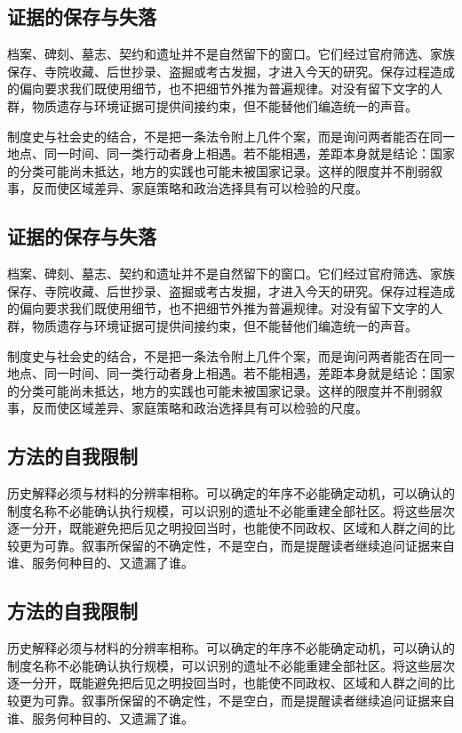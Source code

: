 \subsection{证据的保存与失落}

档案、碑刻、墓志、契约和遗址并不是自然留下的窗口。它们经过官府筛选、家族保存、寺院收藏、后世抄录、盗掘或考古发掘，才进入今天的研究。保存过程造成的偏向要求我们既使用细节，也不把细节外推为普遍规律。对没有留下文字的人群，物质遗存与环境证据可提供间接约束，但不能替他们编造统一的声音。

制度史与社会史的结合，不是把一条法令附上几件个案，而是询问两者能否在同一地点、同一时间、同一类行动者身上相遇。若不能相遇，差距本身就是结论：国家的分类可能尚未抵达，地方的实践也可能未被国家记录。这样的限度并不削弱叙事，反而使区域差异、家庭策略和政治选择具有可以检验的尺度。
\subsection{证据的保存与失落}

档案、碑刻、墓志、契约和遗址并不是自然留下的窗口。它们经过官府筛选、家族保存、寺院收藏、后世抄录、盗掘或考古发掘，才进入今天的研究。保存过程造成的偏向要求我们既使用细节，也不把细节外推为普遍规律。对没有留下文字的人群，物质遗存与环境证据可提供间接约束，但不能替他们编造统一的声音。

制度史与社会史的结合，不是把一条法令附上几件个案，而是询问两者能否在同一地点、同一时间、同一类行动者身上相遇。若不能相遇，差距本身就是结论：国家的分类可能尚未抵达，地方的实践也可能未被国家记录。这样的限度并不削弱叙事，反而使区域差异、家庭策略和政治选择具有可以检验的尺度。

\subsection{方法的自我限制}

历史解释必须与材料的分辨率相称。可以确定的年序不必能确定动机，可以确认的制度名称不必能确认执行规模，可以识别的遗址不必能重建全部社区。将这些层次逐一分开，既能避免把后见之明投回当时，也能使不同政权、区域和人群之间的比较更为可靠。叙事所保留的不确定性，不是空白，而是提醒读者继续追问证据来自谁、服务何种目的、又遗漏了谁。
\subsection{方法的自我限制}

历史解释必须与材料的分辨率相称。可以确定的年序不必能确定动机，可以确认的制度名称不必能确认执行规模，可以识别的遗址不必能重建全部社区。将这些层次逐一分开，既能避免把后见之明投回当时，也能使不同政权、区域和人群之间的比较更为可靠。叙事所保留的不确定性，不是空白，而是提醒读者继续追问证据来自谁、服务何种目的、又遗漏了谁。

